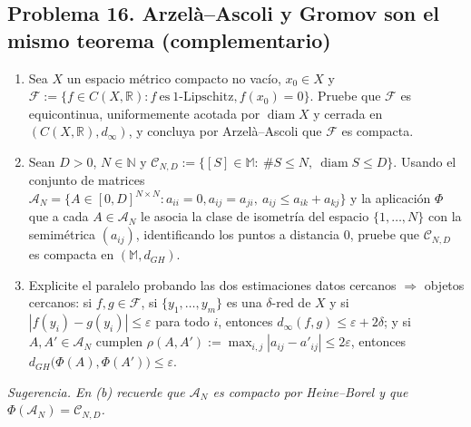 \documentclass[11pt,a4paper]{article}
\begin{document}
\subsection*{\hypertarget{prob-16}{}Problema 16. Arzelà–Ascoli y Gromov son el mismo teorema {\normalfont\small(complementario)}}
\begin{enumerate}[label=(\alph*),leftmargin=2.2em,itemsep=2pt]
\item[(a)] Sea $X$ un espacio métrico compacto no vacío, $x_0\in X$ y $\mathcal F:=\bigl\{f\in C(X,\mathbb{R}): f\ \text{es}\ 1\text{-Lipschitz}, f(x_0)=0\bigr\}$. Pruebe que $\mathcal F$ es equicontinua, uniformemente acotada por $\operatorname{diam} X$ y cerrada en $(C(X,\mathbb{R}),d_\infty)$, y concluya por Arzelà–Ascoli que $\mathcal F$ es compacta.
\item[(b)] Sean $D\gt 0$, $N\in\mathbb{N}$ y $\mathcal C_{N,D}:=\{[S]\in\mathbb M:\ \#S\le N,\ \operatorname{diam} S\le D\}$. Usando el conjunto de matrices $\mathcal A_N=\{A\in[0,D]^{N\times N}: a_{ii}=0, a_{ij}=a_{ji},\ a_{ij}\le a_{ik}+a_{kj}\}$ y la aplicación $\Phi$ que a cada $A\in\mathcal A_N$ le asocia la clase de isometría del espacio $\{1,\dots,N\}$ con la semimétrica $(a_{ij})$, identificando los puntos a distancia $0$, pruebe que $\mathcal C_{N,D}$ es compacta en $(\mathbb M,d_{GH})$.
\item[(c)] Explicite el paralelo probando las dos estimaciones \guillemotleft{}datos cercanos $\Rightarrow$ objetos cercanos\guillemotright{}: si $f,g\in\mathcal F$, si $\{y_1,\dots,y_m\}$ es una $\delta$-red de $X$ y si $|f(y_i)-g(y_i)|\le\varepsilon$ para todo $i$, entonces $d_\infty(f,g)\le\varepsilon+2\delta$; y si $A,A'\in\mathcal A_N$ cumplen $\rho(A,A'):=\max_{i,j}|a_{ij}-a'_{ij}|\le2\varepsilon$, entonces $d_{GH}\bigl(\Phi(A),\Phi(A')\bigr)\le\varepsilon$.
\end{enumerate}
{\small\itshape Sugerencia. En (b) recuerde que $\mathcal A_N$ es compacto por Heine–Borel y que $\Phi(\mathcal A_N)=\mathcal C_{N,D}$.}
\end{document}

